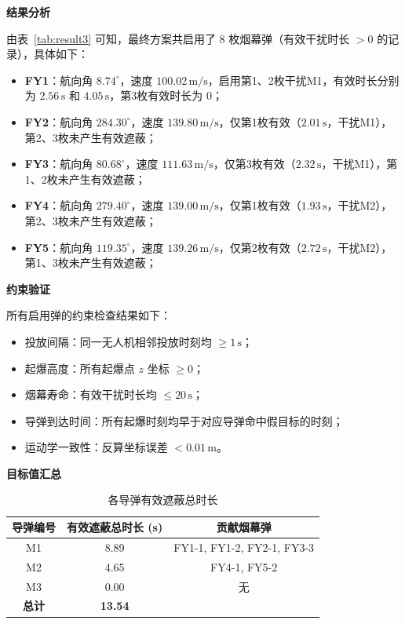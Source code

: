 \documentclass[12pt,a4paper]{article}
\begin{document}
	\textbf{结果分析}
	
	由表~\ref{tab:result3} 可知，最终方案共启用了 8 枚烟幕弹（有效干扰时长 $>0$ 的记录），具体如下：
	
	\begin{itemize}
		\item \textbf{FY1}：航向角 $8.74^\circ$，速度 $100.02\,\text{m/s}$，启用第1、2枚干扰M1，有效时长分别为 $2.56\,\text{s}$ 和 $4.05\,\text{s}$，第3枚有效时长为 $0$；
		\item \textbf{FY2}：航向角 $284.30^\circ$，速度 $139.80\,\text{m/s}$，仅第1枚有效（$2.01\,\text{s}$，干扰M1），第2、3枚未产生有效遮蔽；
		\item \textbf{FY3}：航向角 $80.68^\circ$，速度 $111.63\,\text{m/s}$，仅第3枚有效（$2.32\,\text{s}$，干扰M1），第1、2枚未产生有效遮蔽；
		\item \textbf{FY4}：航向角 $279.40^\circ$，速度 $139.00\,\text{m/s}$，仅第1枚有效（$1.93\,\text{s}$，干扰M2），第2、3枚未产生有效遮蔽；
		\item \textbf{FY5}：航向角 $119.35^\circ$，速度 $139.26\,\text{m/s}$，仅第2枚有效（$2.72\,\text{s}$，干扰M2），第1、3枚未产生有效遮蔽；
	\end{itemize}
	
	\textbf{约束验证}
	
	所有启用弹的约束检查结果如下：
	\begin{itemize}
		\item 投放间隔：同一无人机相邻投放时刻均 $\geq 1\,\text{s}$；
		\item 起爆高度：所有起爆点 $z$ 坐标 $\geq 0$；
		\item 烟幕寿命：有效干扰时长均 $\leq 20\,\text{s}$；
		\item 导弹到达时间：所有起爆时刻均早于对应导弹命中假目标的时刻；
		\item 运动学一致性：反算坐标误差 $<0.01\,\text{m}$。
	\end{itemize}
	
	\textbf{目标值汇总}
	
	\begin{table}[H]
		\centering
		\caption{各导弹有效遮蔽总时长}
		\label{tab:result3_summary}
		\begin{tabular}{c|c|c}
			\hline
			导弹编号 & 有效遮蔽总时长 (s) & 贡献烟幕弹 \\
			\hline
			M1 & 8.89 & FY1-1, FY1-2, FY2-1, FY3-3 \\
			M2 & 4.65 & FY4-1, FY5-2 \\
			M3 & 0.00 & 无 \\
			\hline
			\textbf{总计} & \textbf{13.54} & \\
			\hline
		\end{tabular}
	\end{table}
	
\end{document}
